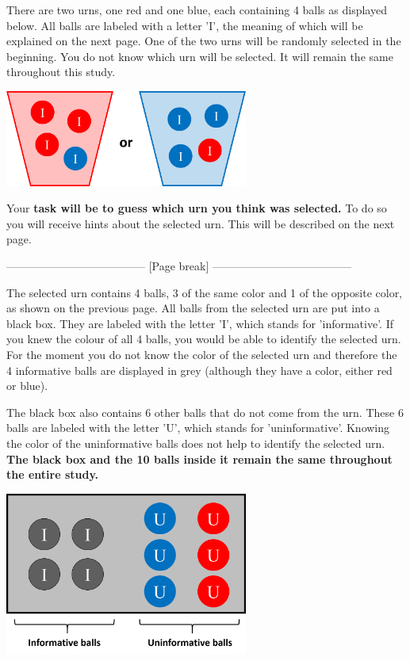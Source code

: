 \noindent There are two urns, one red and one blue, each containing 4 balls as displayed below. All balls are labeled with a letter 'I', the meaning of which will be explained on the next page. One of the two urns will be randomly selected in the beginning. You do not know which urn will be selected. It will remain the same throughout this study. 

\vspace{1cm}
\includegraphics[width=8cm]{instructions/red_or_blue_urn.png}
\vspace{1cm}

\noindent Your \textbf{task will be to guess which urn you think was selected.} To do so you will receive hints about the selected urn. This will be described on the next page. 

-------------------------------------- [Page break] --------------------------------------

\noindent The selected urn contains 4 balls, 3 of the same color and 1 of the opposite color, as shown on the previous page. All balls from the selected urn are put into a black box. They are labeled with the letter 'I', which stands for 'informative'. If you knew the colour of all 4 balls, you would be able to identify the selected urn. For the moment you do not know the color of the selected urn and therefore the 4 informative balls are displayed in grey (although they have a color, either red or blue). 

\noindent The black box also contains 6 other balls that do not come from the urn. These 6 balls are labeled with the letter 'U', which stands for 'uninformative'. Knowing the color of the uninformative balls does not help to identify the selected urn. \textbf{The black box and the 10 balls inside it remain the same throughout the entire study. }

\vspace{1cm}
\includegraphics[width=8cm]{instructions/black_box.png}
\vspace{1cm}

